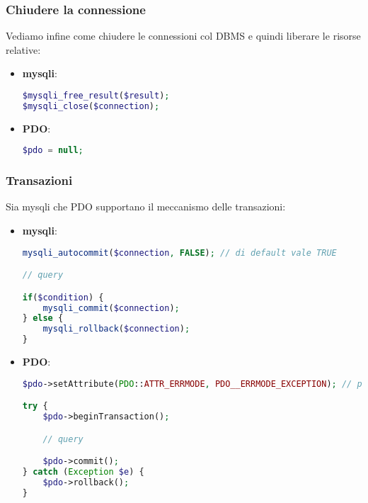 \documentclass[a4paper,11pt]{article}
\begin{document}
\subsubsection{Chiudere la connessione}
Vediamo infine come chiudere le connessioni col DBMS e quindi liberare le risorse relative:
\begin{itemize}
	\item \textbf{mysqli}:
\begin{lstlisting}[language=php, style=codestyle]	
$mysqli_free_result($result);
$mysqli_close($connection);
\end{lstlisting}
	\item \textbf{PDO}:
\begin{lstlisting}[language=php, style=codestyle]	
$pdo = null;
\end{lstlisting}
\end{itemize}

\subsubsection{Transazioni}
Sia mysqli che PDO supportano il meccanismo delle transazioni:
\begin{itemize}
	\item \textbf{mysqli}:
\begin{lstlisting}[language=php, style=codestyle]	
mysqli_autocommit($connection, FALSE); // di default vale TRUE

// query

if($condition) {
	mysqli_commit($connection);
} else {
	mysqli_rollback($connection);
}
\end{lstlisting}
	\item \textbf{PDO}:
\begin{lstlisting}[language=php, style=codestyle]	
$pdo->setAttribute(PDO::ATTR_ERRMODE, PDO__ERRMODE_EXCEPTION); // per ottenere eccezioni dal DBMS

try {
	$pdo->beginTransaction();

	// query

	$pdo->commit();
} catch (Exception $e) {
	$pdo->rollback();
}
\end{lstlisting}
\end{itemize}
\end{document}
